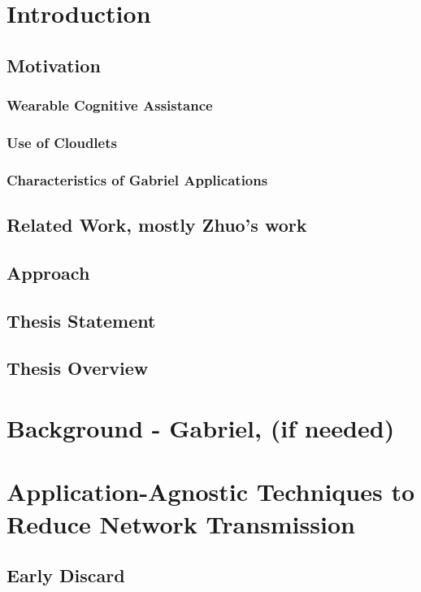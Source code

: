 \section{Introduction}
\subsection{Motivation}
\subsubsection{Wearable Cognitive Assistance}
\subsubsection{Use of Cloudlets}
\subsubsection{Characteristics of Gabriel Applications}
\subsection{Related Work, mostly Zhuo's work}
\subsection{Approach}
\subsection{Thesis Statement}
\subsection{Thesis Overview}

\section{Background - Gabriel, (if needed)}

\section{Application-Agnostic Techniques to Reduce Network Transmission}
\subsection{Early Discard}
